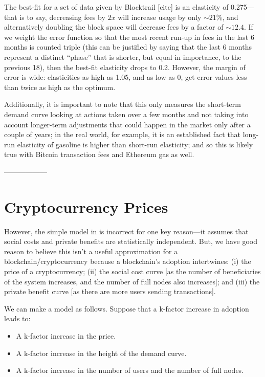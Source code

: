 \documentclass[12pt, final]{article}
\begin{document}
The best-fit for a set of data given by Blocktrail [cite] is an elasticity of 0.275---that is to say, decreasing fees by $2x$ will increase usage by only $\sim 21\%$, and alternatively doubling the block space will decrease fees by a factor of $\sim12.4$. If we weight the error function so that the most recent run-up in fees in the last 6 months is counted triple (this can be justified by saying that the last 6 months represent a distinct ``phase'' that is shorter, but equal in importance, to the previous 18), then the best-fit elasticity drops to 0.2. However, the margin of error is wide: elasticities as high as 1.05, and as low as 0, get error values less than twice as high as the optimum.   

Additionally, it is important to note that this only measures the short-term demand curve looking at actions taken over a few months and not taking into account longer-term adjustments that could happen in the market only after a couple of years; in the real world, for example, it is an established fact that long-run elasticity of gasoline is higher than short-run elasticity\cite{env-econ}; and so this is likely true with Bitcoin transaction fees and Ethereum gas as well. 





------------------

\section{Cryptocurrency Prices}

However, the simple model in  is incorrect for one key reason---it assumes that social costs and private benefits are statistically independent. But, we have good reason to believe this isn't a useful approximation for a blockchain/cryptocurrency because a blockchain's adoption intertwines: (i) the price of a cryptocurrency; (ii) the social cost curve [as the number of beneficiaries of the system increases, and the number of full nodes also increases]; and (iii) the private benefit curve [as there are more users sending transactions].

We can make a model as follows. Suppose that a k-factor increase in adoption leads to:

\begin{itemize}
    \item A k-factor increase in the price.
    \item A k-factor increase in the height of the demand curve.
    \item A k-factor increase in the number of users and the number of full nodes.
\end{itemize}
\end{document}
